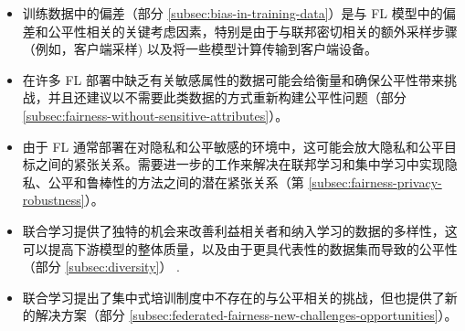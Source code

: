 \begin{itemize}
    \item 训练数据中的偏差（部分 \ref{subsec:bias-in-training-data}）是与 FL 模型中的偏差和公平性相关的关键考虑因素，特别是由于与联邦密切相关的额外采样步骤（例如，客户端采样) 以及将一些模型计算传输到客户端设备。
    \item 在许多 FL 部署中缺乏有关敏感属性的数据可能会给衡量和确保公平性带来挑战，并且还建议以不需要此类数据的方式重新构建公平性问题（部分 \ref{subsec:fairness-without-sensitive-attributes}）。
    \item 由于 FL 通常部署在对隐私和公平敏感的环境中，这可能会放大隐私和公平目标之间的紧张关系。需要进一步的工作来解决在联邦学习和集中学习中实现隐私、公平和鲁棒性的方法之间的潜在紧张关系（第 \ref{subsec:fairness-privacy-robustness}）。
    \item 联合学习提供了独特的机会来改善利益相关者和纳入学习的数据的多样性，这可以提高下游模型的整体质量，以及由于更具代表性的数据集而导致的公平性（部分 \ref{subsec:diversity}） .
    \item 联合学习提出了集中式培训制度中不存在的与公平相关的挑战，但也提供了新的解决方案（部分 \ref{subsec:federated-fairness-new-challenges-opportunities}）。
\end{itemize}

%


